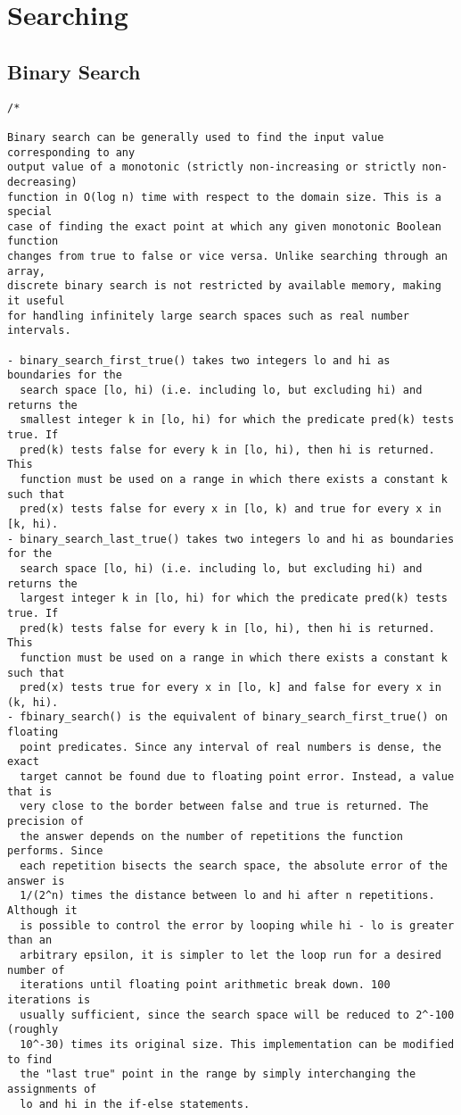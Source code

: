 \section{Searching}
\setcounter{section}{3}
\setcounter{subsection}{0}
\subsection{Binary Search}
\begin{lstlisting}
/*

Binary search can be generally used to find the input value corresponding to any
output value of a monotonic (strictly non-increasing or strictly non-decreasing)
function in O(log n) time with respect to the domain size. This is a special
case of finding the exact point at which any given monotonic Boolean function
changes from true to false or vice versa. Unlike searching through an array,
discrete binary search is not restricted by available memory, making it useful
for handling infinitely large search spaces such as real number intervals.

- binary_search_first_true() takes two integers lo and hi as boundaries for the
  search space [lo, hi) (i.e. including lo, but excluding hi) and returns the
  smallest integer k in [lo, hi) for which the predicate pred(k) tests true. If
  pred(k) tests false for every k in [lo, hi), then hi is returned. This
  function must be used on a range in which there exists a constant k such that
  pred(x) tests false for every x in [lo, k) and true for every x in [k, hi).
- binary_search_last_true() takes two integers lo and hi as boundaries for the
  search space [lo, hi) (i.e. including lo, but excluding hi) and returns the
  largest integer k in [lo, hi) for which the predicate pred(k) tests true. If
  pred(k) tests false for every k in [lo, hi), then hi is returned. This
  function must be used on a range in which there exists a constant k such that
  pred(x) tests true for every x in [lo, k] and false for every x in (k, hi).
- fbinary_search() is the equivalent of binary_search_first_true() on floating
  point predicates. Since any interval of real numbers is dense, the exact
  target cannot be found due to floating point error. Instead, a value that is
  very close to the border between false and true is returned. The precision of
  the answer depends on the number of repetitions the function performs. Since
  each repetition bisects the search space, the absolute error of the answer is
  1/(2^n) times the distance between lo and hi after n repetitions. Although it
  is possible to control the error by looping while hi - lo is greater than an
  arbitrary epsilon, it is simpler to let the loop run for a desired number of
  iterations until floating point arithmetic break down. 100 iterations is
  usually sufficient, since the search space will be reduced to 2^-100 (roughly
  10^-30) times its original size. This implementation can be modified to find
  the "last true" point in the range by simply interchanging the assignments of
  lo and hi in the if-else statements.


\end{lstlisting}
